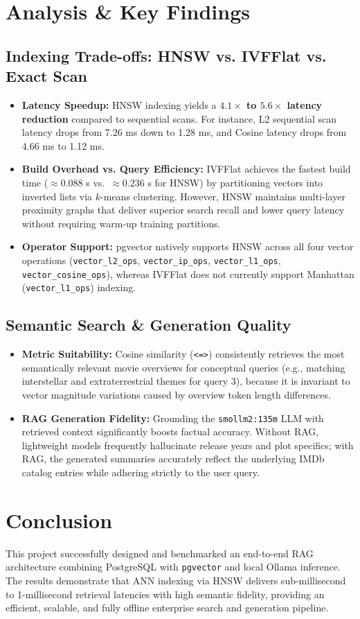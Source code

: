 \documentclass[11pt,a4paper]{article}
\begin{document}
\section{Analysis \& Key Findings}

\subsection{Indexing Trade-offs: HNSW vs. IVFFlat vs. Exact Scan}
\begin{itemize}
    \item \textbf{Latency Speedup:} HNSW indexing yields a \textbf{$4.1\times$ to $5.6\times$ latency reduction} compared to sequential scans. For instance, L2 sequential scan latency drops from 7.26 ms down to 1.28 ms, and Cosine latency drops from 4.66 ms to 1.12 ms.
    \item \textbf{Build Overhead vs. Query Efficiency:} IVFFlat achieves the fastest build time ($\approx 0.088$ s vs.\ $\approx 0.236$ s for HNSW) by partitioning vectors into inverted lists via $k$-means clustering. However, HNSW maintains multi-layer proximity graphs that deliver superior search recall and lower query latency without requiring warm-up training partitions.
    \item \textbf{Operator Support:} pgvector natively supports HNSW across all four vector operations (\texttt{vector\_l2\_ops}, \texttt{vector\_ip\_ops}, \texttt{vector\_l1\_ops}, \texttt{vector\_cosine\_ops}), whereas IVFFlat does not currently support Manhattan (\texttt{vector\_l1\_ops}) indexing.
\end{itemize}

\subsection{Semantic Search \& Generation Quality}
\begin{itemize}
    \item \textbf{Metric Suitability:} Cosine similarity (\texttt{<=>}) consistently retrieves the most semantically relevant movie overviews for conceptual queries (e.g., matching interstellar and extraterrestrial themes for query 3), because it is invariant to vector magnitude variations caused by overview token length differences.
    \item \textbf{RAG Generation Fidelity:} Grounding the \texttt{smollm2:135m} LLM with retrieved context significantly boosts factual accuracy. Without RAG, lightweight models frequently hallucinate release years and plot specifics; with RAG, the generated summaries accurately reflect the underlying IMDb catalog entries while adhering strictly to the user query.
\end{itemize}

\section{Conclusion}
This project successfully designed and benchmarked an end-to-end RAG architecture combining PostgreSQL with \texttt{pgvector} and local Ollama inference. The results demonstrate that ANN indexing via HNSW delivers sub-millisecond to 1-millisecond retrieval latencies with high semantic fidelity, providing an efficient, scalable, and fully offline enterprise search and generation pipeline.
\end{document}
